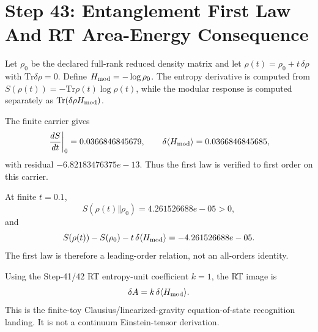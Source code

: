 \documentclass[11pt]{article}
\begin{document}
\section*{Step 43: Entanglement First Law And RT Area-Energy Consequence}

Let $\rho_0$ be the declared full-rank reduced density matrix and let
$\rho(t)=\rho_0+t\,\delta\rho$ with $\mathrm{{Tr}}\delta\rho=0$. Define
$H_{{\rm mod}}=-\log\rho_0$. The entropy derivative is computed from
$S(\rho(t))=-\mathrm{{Tr}}\rho(t)\log\rho(t)$, while the modular response is
computed separately as $\mathrm{{Tr}}(\delta\rho H_{\rm mod})$.

The finite carrier gives
\[
\left.\frac{{dS}}{{dt}}\right|_0 = 0.0366846845679,
\qquad
\delta\langle H_{{\rm mod}}\rangle = 0.0366846845685,
\]
with residual $-6.82183476375e-13$. Thus the first law is
verified to first order on this carrier.

At finite $t=0.1$,
\[
S(\rho(t)\Vert\rho_0)=4.261526688e-05>0,
\]
and
\[
S(\rho(t))-S(\rho_0)-t\,\delta\langle H_{{\rm mod}}\rangle
=-4.261526688e-05.
\]
The first law is therefore a leading-order relation, not an all-orders
identity.

Using the Step-41/42 RT entropy-unit coefficient $k=1$, the
RT image is
\[
\delta A = k\,\delta\langle H_{{\rm mod}}\rangle.
\]
This is the finite-toy Clausius/linearized-gravity equation-of-state
recognition landing. It is not a continuum Einstein-tensor derivation.
\end{document}
